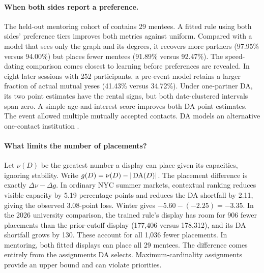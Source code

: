 \paragraph{When both sides report a preference.}
The held-out mentoring cohort of \citet{haashall2019} contains 29 mentees. A fitted rule using both sides' preference tiers improves both metrics against uniform. Compared with a model that sees only the graph and its degrees, it recovers more partners (97.95\% versus 94.00\%) but places fewer mentees (91.89\% versus 92.47\%). The speed-dating comparison comes closest to learning before preferences are revealed. In eight later sessions with 252 participants, a pre-event model retains a larger fraction of actual mutual yeses (41.43\% versus 34.72\%). Under one-partner DA, its two point estimates have the rental signs, but both date-clustered intervals span zero. A simple age-and-interest score improves both DA point estimates. The event allowed multiple mutually accepted contacts. DA models an alternative one-contact institution \citep{fisman2006dating,bhargava2014data}.

\paragraph{What limits the number of placements?}
Let $\nu(D)$ be the greatest number a display can place given its capacities, ignoring stability. Write $g(D)=\nu(D)-|\operatorname{DA}(D)|$. The placement difference is exactly $\Delta\nu-\Delta g$. In ordinary NYC summer markets, contextual ranking reduces visible capacity by 5.19 percentage points and reduces the DA shortfall by 2.11, giving the observed 3.08-point loss. Winter gives $-5.60-(-2.25)=-3.35$. In the 2026 university comparison, the trained rule's display has room for 906 fewer placements than the prior-cutoff display (177,406 versus 178,312), and its DA shortfall grows by 130. These account for all 1,036 fewer placements. In mentoring, both fitted displays can place all 29 mentees. The difference comes entirely from the assignments DA selects. Maximum-cardinality assignments provide an upper bound and can violate priorities.
